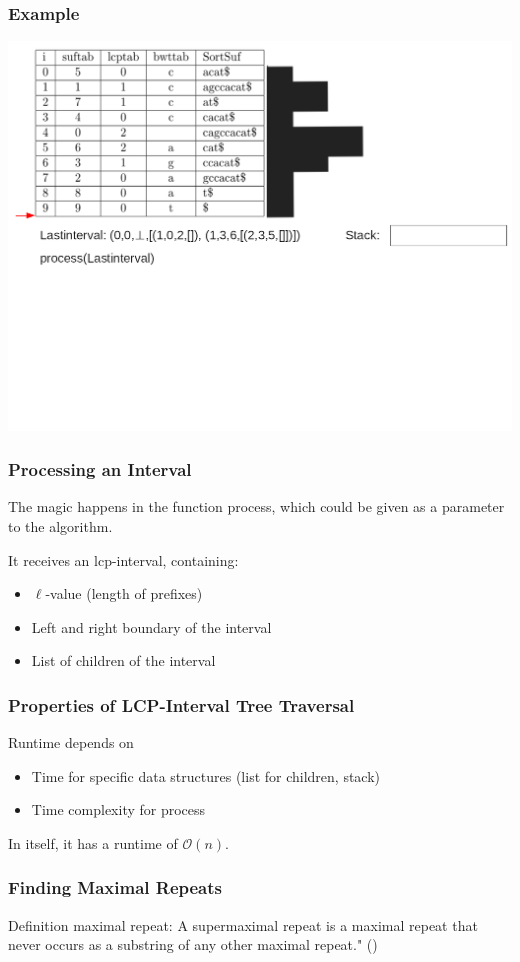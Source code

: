 \documentclass[compress,handout]{beamer} %
\renewcommand{\O}{\mathcal{O}}
\begin{document}
\begin{frame}
	\frametitle{Example}
	\includegraphics[width=\textwidth, height=\textheight, keepaspectratio=true]{traversal_15}
\end{frame}

\begin{frame}
	\frametitle{Processing an Interval}
	The magic happens in the function process, which could be given
	as a parameter to the algorithm.

	It receives an lcp-interval, containing:
	\begin{itemize}
		\item $\ell$-value (length of prefixes)
		\item Left and right boundary of the interval
		\item List of children of the interval
	\end{itemize}
\end{frame}

\begin{frame}
	\frametitle{Properties of LCP-Interval Tree Traversal}
	Runtime depends on
	\begin{itemize}
		\item Time for specific data structures (list for children, stack)
		\item Time complexity for process
	\end{itemize}

	In itself, it has a runtime of $\O(n)$.
\end{frame}

\begin{frame}
	\frametitle{Finding Maximal Repeats}

	Definition maximal repeat: \dq A supermaximal repeat is a maximal
	repeat that never occurs as a substring of any other maximal
	repeat." (\cite{abouelhoda2002enhanced})
\end{frame}
\end{document}
